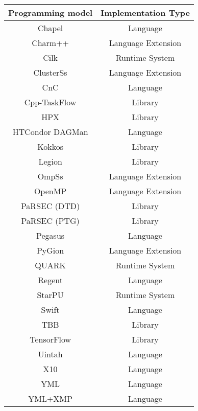 \begin{tabular}{cc}
\hline
Programming model & Implementation Type \\
\hline
Chapel & Language\\
Charm++ & Language Extension\\
Cilk & Runtime System\\
ClusterSs & Language Extension\\
CnC & Language\\
Cpp-TaskFlow & Library\\
HPX & Library\\
HTCondor DAGMan & Language\\
Kokkos & Library\\
Legion & Library\\
OmpSs & Language Extension\\
OpenMP & Language Extension\\
PaRSEC (DTD) & Library\\
PaRSEC (PTG) & Library\\
Pegasus & Language\\
PyGion & Language Extension\\
QUARK & Runtime System\\
Regent & Language\\
StarPU & Runtime System\\
Swift & Language\\
TBB & Library\\
TensorFlow & Library\\
Uintah & Language\\
X10 & Language\\
YML & Language\\
YML+XMP & Language\\
\hline
\end{tabular}
